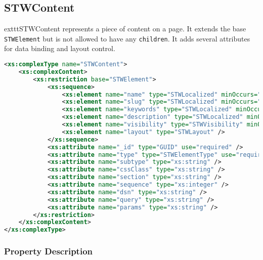 \subsection{STWContent}

	exttt{STWContent} represents a piece of content on a page. It extends the base \texttt{STWElement} but is not allowed to have any \texttt{children}. It adds several attributes for data binding and layout control.

\begin{lstlisting}[language=XML,caption={STWContent Type Definition}]
<xs:complexType name="STWContent">
	<xs:complexContent>
		<xs:restriction base="STWElement">
			<xs:sequence>
				<xs:element name="name" type="STWLocalized" minOccurs="1" />
				<xs:element name="slug" type="STWLocalized" minOccurs="1" />
				<xs:element name="keywords" type="STWLocalized" minOccurs="0" />
				<xs:element name="description" type="STWLocalized" minOccurs="0" />
				<xs:element name="visibility" type="STWVisibility" minOccurs="0" />
				<xs:element name="layout" type="STWLayout" />
			</xs:sequence>
			<xs:attribute name="_id" type="GUID" use="required" />
			<xs:attribute name="type" type="STWElementType" use="required" fixed="Content" />
			<xs:attribute name="subtype" type="xs:string" />
			<xs:attribute name="cssClass" type="xs:string" />
			<xs:attribute name="section" type="xs:string" />
			<xs:attribute name="sequence" type="xs:integer" />
			<xs:attribute name="dsn" type="xs:string" />
			<xs:attribute name="query" type="xs:string" />
			<xs:attribute name="params" type="xs:string" />
		</xs:restriction>
	</xs:complexContent>
</xs:complexType>
\end{lstlisting}

\subsubsection{Property Description}

